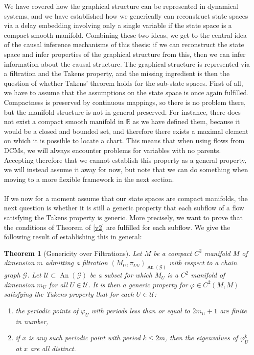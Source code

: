 \documentclass[11pt, a4paper]{memoir}
\theoremstyle{break}
\newtheorem{thm}{Theorem}
\theoremstyle{break}
\theoremstyle{nonumberplain}
\newcommand{\mR}{\mathbb{R}}
\DeclareMathOperator{\an}{An}
\begin{document}
We have covered how the graphical structure can be represented in dynamical systems, and we have established how we generically can reconstruct state spaces via a delay embedding involving only a single variable if the state space is a compact smooth manifold. Combining these two ideas, we get to the central idea of the causal inference mechanisms of this thesis: if we can reconstruct the state space and infer properties of the graphical structure from this, then we can infer information about the causal structure. The graphical structure is represented via a filtration and the Takens property, and the missing ingredient is then the question of whether Takens' theorem holds for the sub-state spaces. First of all, we have to assume that the assumptions on the state space is once again fulfilled. Compactness is preserved by continuous mappings, so there is no problem there, but the manifold structure is not in general preserved. For instance, there does not exist a compact smooth manifold in $\mR$ as we have defined them, because it would be a closed and bounded set, and therefore there exists a maximal element on which it is possible to locate a chart. This means that when using flows from DCMs, we will always encounter problems for variables with no parents. Accepting therefore that we cannot establish this property as a general property, we will instead assume it away for now, but note that we can do something when moving to a more flexible framework in the next section.\\\\
If we now for a moment assume that our state spaces are compact manifolds, the next question is whether it is still a generic property that each subflow of a flow satisfying the Takens property is generic. More precisely, we want to prove that the conditions of Theorem of \ref{v2} are fulfilled for each subflow. We give the following result of \cite{mathFound} establishing this in general:
\begin{thm}[Genericity over Filtrations]\label{tech}
Let $M$ be a compact $C^2$ manifold $M$ of dimension $m$ admitting a filtration $(M_U,\pi_{UV})_{\an(\mathcal{G})}$ with respect to a chain graph $\mathcal{G}$. Let $\mathcal{U}\subset \an(\mathcal{G})$ be a subset for which $M_U$ is a $C^2$ manifold of dimension $m_U$ for all $U\in \mathcal{U}$. It is then a generic property for $\varphi\in C^2(M,M)$ satisfying the Takens property that for each $U\in \mathcal{U}$: 
\begin{enumerate}[label=\arabic*)]
	\item the periodic points of $\varphi_U$ with periods less than or equal to $2m_U+1$ are finite in number,
	\item if $x$ is any such periodic point with period $k\leqslant 2m$, then the eigenvalues of $\varphi^k_U$ at $x$ are all distinct.
\end{enumerate}
\end{thm}
\end{document}
